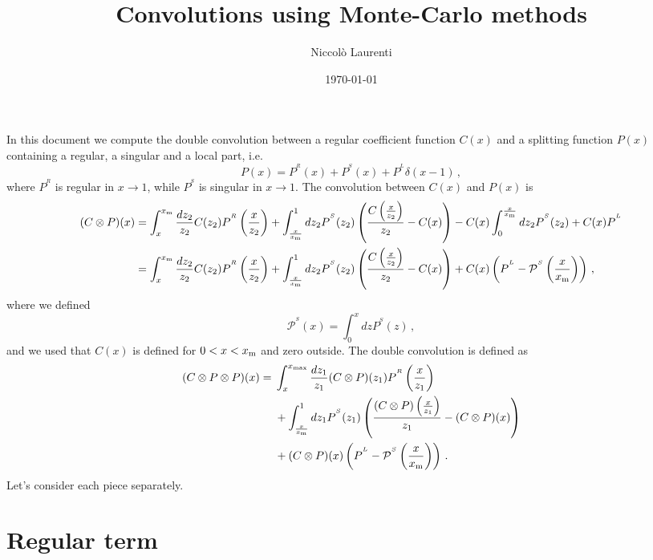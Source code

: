 \documentclass[a4paper]{article}
\title{Convolutions using Monte-Carlo methods}
\author{Niccolò Laurenti}
\date{\today}
\newcommand{\PR}[0]{P^{^R}}
\newcommand{\PS}[0]{P^{^S}}
\newcommand{\PmS}[0]{\mathcal{P}^{^S}}
\newcommand{\PL}[0]{P^{^L}}
\newcommand{\xm}[0]{x_{\rm m}}
\begin{document}
	In this document we compute the double convolution between a regular coefficient function $C(x)$ and a splitting function $P(x)$ containing a regular, a singular and a local part, i.e.
	\begin{equation}
		P(x) = P^{^R}(x) + P^{^S}(x) + P^{^L} \delta(x-1)\, ,
	\end{equation}
where $\PR$ is regular in $x\rightarrow 1$, while $\PS$ is singular in $x\rightarrow 1$.
The convolution between $C(x)$ and $P(x)$ is
\begin{align}
	(C \otimes P)(x)&=\int_x^{\xm} \frac{dz_2}{z_2} C(z_2) \PR \left(\frac{x}{z_2}\right) + \int_{\frac{x}{\xm}}^1dz_2 \PS(z_2) \left( \frac{C\left(\frac{x}{z_2}\right)}{z_2} - C(x)\right)-C(x)\int_0^{\frac{x}{\xm}}dz_2\PS(z_2) + C(x)\PL \notag \\
	&=\int_x^{\xm} \frac{dz_2}{z_2} C(z_2) \PR \left(\frac{x}{z_2}\right) + \int_{\frac{x}{\xm}}^1dz_2 \PS(z_2) \left( \frac{C\left(\frac{x}{z_2}\right)}{z_2} - C(x)\right)+ C(x)\left(\PL - \PmS\left(\frac{x}{\xm}\right)\right) \, ,
\end{align}
where we defined
\begin{equation*}
	\PmS(x) = \int_0^{x}dz\PS(z) \, ,
\end{equation*}
and we used that $C(x)$ is defined for $0<x<\xm$ and zero outside.
The double convolution is defined as
\begin{equation}
	\begin{split}
		(C \otimes P \otimes P)(x)  ={}& \int_x^{x_{\rm max}} \frac{dz_1}{z_1} (C \otimes P)(z_1) \PR \left(\frac{x}{z_1}\right) \\
		&+ \int_{\frac{x}{\xm}}^1dz_1 \PS(z_1) \left( \frac{(C \otimes P)\left(\frac{x}{z_1}\right)}{z_1} - (C \otimes P)(x)\right)\\
		& + (C \otimes P)(x)\left(\PL - \PmS\left(\frac{x}{\xm}\right)\right)\,.
	\end{split}
\end{equation}
Let's consider each piece separately.
\section{Regular term}
\end{document}
